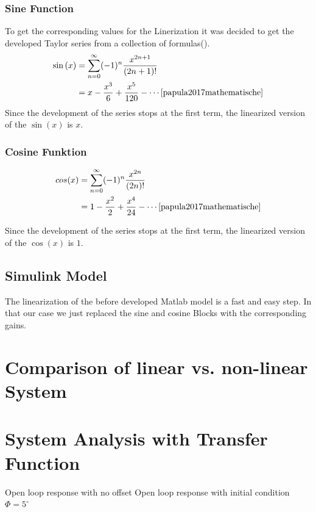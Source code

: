 \subsubsection{Sine Function}
To get the corresponding values for the Linerization it was decided to get the developed Taylor series from a collection of formulas(\cite{papula2017mathematische}).
\begin{align}
    \sin \,(x)&=\sum _{n=0}^{\infty }(-1)^{n}{\frac {x^{2n+1}}{(2n+1)!}} \\
    &=x-{\frac {x^{3}}{6}}+{\frac {x^{5}}{120}}-\cdots \cite[p. 187]{papula2017mathematische}
\end{align}
Since the development of the series stops at the first term, the linearized version of the $\sin(x)$ is $x$.
\subsubsection{Cosine Funktion}
\begin{align}
    cos(x)&=\sum _{n=0}^{\infty }(-1)^{n}{\frac {x^{2n}}{(2n)!}}\\
    &=1-{\frac {x^{2}}{2}}+{\frac {x^{4}}{24}}-\cdots  \cite[p. 187]{papula2017mathematische}
\end{align}

Since the development of the series stops at the first term, the linearized version of the $\cos(x)$ is $1$.
\subsection{Simulink Model}
The linearization of the before developed Matlab model is a fast and easy step. In that our case we just replaced the sine and cosine Blocks with the corresponding gains. 

\section{Comparison of linear vs. non-linear System}
\label{ssection:Comparison_lin_non_lin}

\section{System Analysis with Transfer Function}

Open loop response with no offset
Open loop response with initial condition $\Phi = 5^\circ$